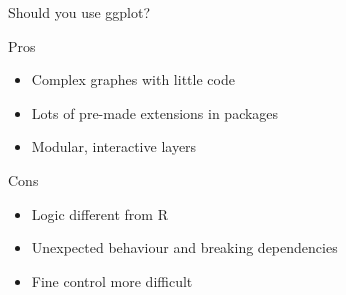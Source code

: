 \documentclass[10pt]{beamer}\usepackage[]{graphicx}\usepackage[]{color}
\begin{document}
\begin{frame}{Should you use ggplot?}
  \begin{exampleblock}{Pros}
    \begin{itemize}
    \item Complex graphes with little code
    \item Lots of pre-made extensions in packages
    \item Modular, interactive layers
    \end{itemize}
  \end{exampleblock}

\pause

  \begin{alertblock}{Cons}
    \begin{itemize}
    \item Logic different from R
    \item Unexpected behaviour and breaking dependencies
    \item Fine control more difficult
    \end{itemize}
  \end{alertblock}

\end{frame}
\end{document}
